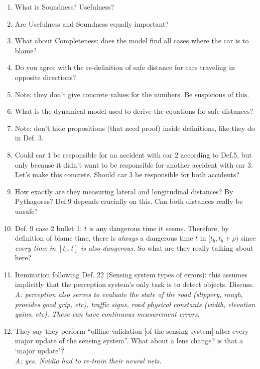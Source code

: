 \documentclass[letta4 paper]{article}
\numberwithin{equation}{section}
\newcommand{\0}{\mathbf{0}}
\begin{document}
\begin{enumerate}
		\item What is Soundness? Usefulness? 
		
		\item Are Usefulness and Soundness equally important?
		
		\item What about Completeness: does the model find all cases where the car is to blame?
		
		\item Do you agree with the re-definition of safe distance for cars traveling in opposite directions?
		
		\item Note: they don't give concrete values for the numbers. Be suspicious of this.
		
		\item What is the dynamical model used to derive the equations for safe distances?
		
		\item Note: don't hide propositions (that need proof) inside definitions, like they do in Def. 3.
		
		\item Could car 1 be responsible for an accident with car 2 according to Def.5, but only because it didn't want to be responsible for another accident with car 3. Let's make this concrete. Should car 3 be responsible for both accidents?
		
		\item How exactly are they measuring lateral and longitudinal distances? By Pythagoras? Def.9 depends crucially on this. Can both distances really be unsafe?
		
		\item Def. 9 case 2 bullet 1: $t$ is any dangerous time it seems. Therefore, by definition of blame time, there is \textit{always} a dangerous time $t$ in $[t_b,t_b+\rho)$ since \textit{every time in $[t_b, t]$ is also dangerous.} So what are they really talking about here?
		
		\item Itemization following Def. 22 (Sensing system types of errors): this assumes implicitly that the perception system's only task is to detect objects. Discuss.
		\\
		\textit{A: perception also serves to evaluate the state of the road (slippery, rough, provides good grip, etc), traffic signs, road physical constants (width, elevation gains, etc). These can have continuous measurement errors.}
		
		\item They say they perform ``offline validation [of the sensing system] after every major update of the sensing system''. What about a lens change? is that a `major update'?
		\\
		\textit{A: yes. Nvidia had to re-train their neural nets.}
		

\end{enumerate}
\end{document}
